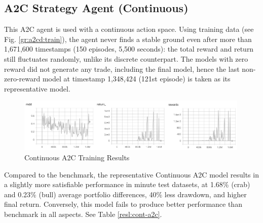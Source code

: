 \subsection{A2C Strategy Agent (Continuous)}
This A2C agent is used with a continuous action space. Using training data (see Fig. \ref{gr:a2cd:train}), the agent never finds a stable ground even after more than 1,671,600 timestamps (150 episodes, 5,500 seconds): the total reward and return still fluctuates randomly, unlike its discrete counterpart. The models with zero reward did not generate any trade, including the final model, hence the last non-zero-reward model at timestamp 1,348,424 (121st episode) is taken as its representative model.

\begin{figure}[H]
    \centering
    \includegraphics[width=0.99\textwidth]{graphics/trainphoto/a2cc-train.png}
    \caption{Continuous A2C Training Results}
    \label{gr:a2cc:train}
\end{figure}

Compared to the benchmark, the representative Continuous A2C model results in a slightly more satisfiable performance in minute test datasets, at 1.68\% (crab) and 0.23\% (bull) average portfolio differences, 40\% less drawdown, and higher final return. Conversely, this model fails to produce better performance than benchmark in all aspects. See Table \ref{resl:cont-a2c}.


